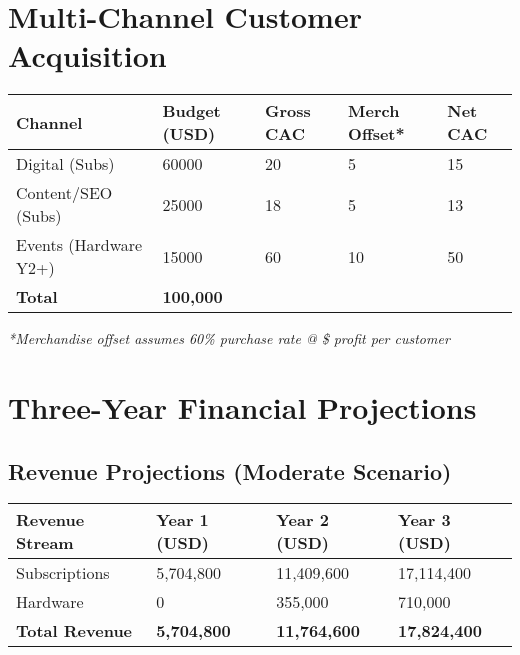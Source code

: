 \documentclass[11pt]{article}
\newcommand{\merchAvgPrice}{28}
\newcommand{\merchAvgMargin}{48}
\newcommand{\merchAvgProfit}{\fpeval{\merchAvgPrice * \merchAvgMargin / 100}}
\newcommand{\merchAttachRate}{60}
\newcommand{\cacDigital}{20}
\newcommand{\cacContent}{18}
\newcommand{\cacEvents}{60}
\newcommand{\merchOffsetSubs}{5}
\newcommand{\merchOffsetHw}{10}
\newcommand{\budgetDigital}{60000}
\newcommand{\budgetContent}{25000}
\newcommand{\budgetEvents}{15000}
\begin{document}
\section{Multi-Channel Customer Acquisition}

\begin{table}[H]
\centering
\begin{tabularx}{\linewidth}{l Y Y Y Y}
\toprule
Channel & Budget (USD) & Gross CAC\cite{authoranalysis2024} & Merch Offset* & Net CAC \\\midrule
Digital (Subs) & \budgetDigital & \cacDigital & \merchOffsetSubs & 15 \\
Content/SEO (Subs) & \budgetContent & \cacContent & \merchOffsetSubs & 13 \\
Events (Hardware Y2+) & \budgetEvents & \cacEvents & \merchOffsetHw & 50 \\\midrule
\textbf{Total} & \textbf{100,000} &  &  &  \\
\bottomrule
\end{tabularx}
\end{table}
\textit{*Merchandise offset assumes \merchAttachRate\% purchase rate @ \$\merchAvgProfit{} profit per customer}

\section{Three-Year Financial Projections}

\subsection{Revenue Projections (Moderate Scenario)}
\begin{table}[H]
\centering
\begin{tabularx}{\linewidth}{l Y Y Y}
\toprule
Revenue Stream & Year 1 (USD) & Year 2 (USD) & Year 3 (USD) \\\midrule
Subscriptions & 5,704,800 & 11,409,600 & 17,114,400 \\
Hardware & 0 & 355,000 & 710,000 \\\midrule
\textbf{Total Revenue} & \textbf{5,704,800} & \textbf{11,764,600} & \textbf{17,824,400} \\
\bottomrule
\end{tabularx}
\end{table}
\end{document}
